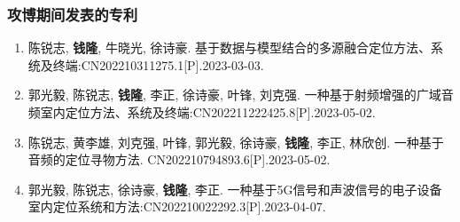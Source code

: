 \begin{frame}
	\frametitle{攻博期间发表的专利}

	\begin{enumerate}
		
		\item 陈锐志, \textbf{钱隆}, 牛晓光, 徐诗豪. 基于数据与模型结合的多源融合定位方法、系统及终端:CN202210311275.1[P].2023-03-03.
		
		\item 郭光毅, 陈锐志, \textbf{钱隆}, 李正, 徐诗豪, 叶锋, 刘克强. 一种基于射频增强的广域音频室内定位方法、系统及终端:CN202211222425.8[P].2023-05-02.
  
		\item 陈锐志, 黄李雄, 刘克强, 叶锋, 郭光毅, 徐诗豪, \textbf{钱隆}, 李正, 林欣创. 一种基于音频的定位寻物方法. CN202210794893.6[P].2023-05-02.
		
		\item 郭光毅, 陈锐志, 徐诗豪, \textbf{钱隆}, 李正. 一种基于5G信号和声波信号的电子设备室内定位系统和方法:CN202210022292.3[P].2023-04-07.

	\end{enumerate}
\end{frame}